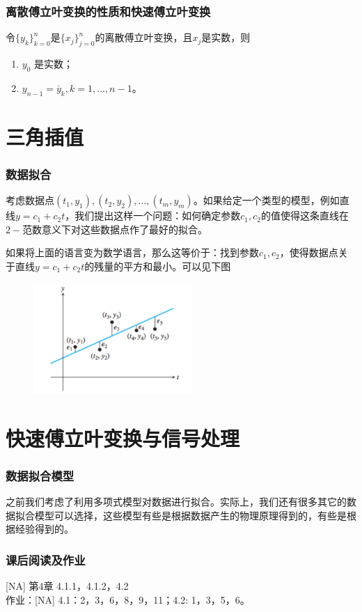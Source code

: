 \documentclass[10pt]{beamer}
\begin{document}
\begin{frame}
\frametitle{离散傅立叶变换的性质和快速傅立叶变换}
\begin{lemma}
令$\{y_k\}_{k = 0}^{n}$是$\{x_j\}_{j = 0}^{n}$的离散傅立叶变换，且$x_j$是实数，则
\begin{enumerate}
\item $y_0$ 是实数；
\item $y_{n-1} = \overline{y}_k, k = 1, \ldots, n-1$。
\end{enumerate}
\end{lemma}

\end{frame}



\section{三角插值}

\begin{frame}
\frametitle{数据拟合}
考虑数据点$(t_1,y_1), (t_2, y_2), \ldots, (t_m, y_m)$。如果给定一个类型的模型，例如直线$y = c_1 + c_2 t$，我们提出这样一个问题：如何确定参数$c_1, c_2$的值使得这条直线在$2-$范数意义下对这些数据点作了最好的拟合。

\vspace{0.2cm}

如果将上面的语言变为数学语言，那么这等价于：找到参数$c_1, c_2$，使得数据点关于直线$y = c_1 + c_2 t$的残量的平方和最小。可以见下图
\begin{figure}
\includegraphics[width=6cm]{figs/4-1-2_Fitting_Data-1} 
\end{figure}
\end{frame}






\section{快速傅立叶变换与信号处理}


\begin{frame}
\frametitle{数据拟合模型}
之前我们考虑了利用多项式模型对数据进行拟合。实际上，我们还有很多其它的数据拟合模型可以选择，这些模型有些是根据数据产生的物理原理得到的，有些是根据经验得到的。
\end{frame}





\begin{frame}
\frametitle{课后阅读及作业}
[NA] 第4章 4.1.1，4.1.2，4.2 \\
作业：[NA] 4.1：2，3，6，8，9，11；4.2: 1，3，5，6。


\end{frame}
\end{document}
